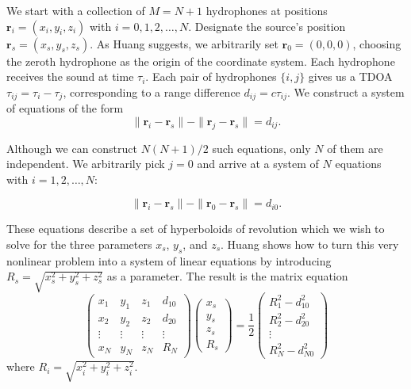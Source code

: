 \documentclass[10pt]{article}
\begin{document}
We start with a collection of \(M=N+1\) hydrophones at positions \(\mathbf{r}_i=(x_i,y_i,z_i)\) with \(i=0,1,2,\dots,N\).  Designate the source's position \(\mathbf{r}_s=(x_s,y_s,z_s)\).  As Huang \cite{Huang} suggests, we arbitrarily set \(\mathbf{r}_0=(0,0,0)\), choosing the zeroth hydrophone as the origin of the coordinate system.  Each hydrophone receives the sound at time \(\tau_i\).  Each pair of hydrophones \(\{i,j\}\) gives us a TDOA \(\tau_{ij}=\tau_i-\tau_j\), corresponding to a range difference \(d_{ij}=c \tau_{ij}\).  We construct a system of equations of the form
\begin{equation}\label{eq:hyperboloid-ij}
\|\mathbf{r}_i-\mathbf{r}_s\|-\|\mathbf{r}_j-\mathbf{r}_s\|=d_{ij}.
\end{equation}

Although we can construct \(N(N+1)/2\) such equations, only \(N\) of them are independent.  We arbitrarily pick \(j=0\) and arrive at a system of \(N\) equations with \(i=1,2,\dots,N\):

\begin{equation}\label{eq:hyperboloid-i0}
\|\mathbf{r}_i-\mathbf{r}_s\|-\|\mathbf{r}_0-\mathbf{r}_s\|=d_{i0}.
\end{equation}

These equations describe a set of hyperboloids of revolution which we wish to solve for the three parameters \(x_s\), \(y_s\), and \(z_s\).  Huang \cite{Huang} shows how to turn this very nonlinear problem into a system of linear equations by introducing \(R_s=\sqrt{x_s^2+y_s^2+z_s^2}\) as a parameter.  The result is the matrix equation
\begin{equation}\label{eq:hyperboloids-matrix}
\left(
\begin{array}{cccc}
x_1 & y_1 & z_1 & d_{10} \\
x_2 & y_2 & z_2 & d_{20} \\
\vdots  & \vdots  & \vdots & \vdots \\
x_N & y_N & z_N & R_N
\end{array}
\right)\left(
\begin{array}{c}
x_s \\
y_s \\
z_s \\
R_s
\end{array}
\right)=\frac{1}{2}\left(
\begin{array}{c}
R_1^2-d_{10}^2 \\
R_2^2-d_{20}^2 \\
\vdots \\
R_N^2-d_{N0}^2
\end{array}
\right)
\end{equation}
where \(R_i=\sqrt{x_i^2+y_i^2+z_i^2}\).
\end{document}
